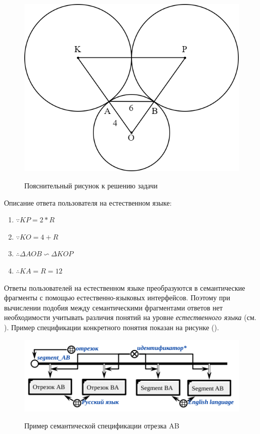\begin{figure}[H]
	\caption{Пояснительный рисунок к решению задачи}
	\includegraphics[scale=0.3]{author/part7/figures/explanatory_illustration_example.png}
	\label{fig:EI_example}
\end{figure}

Описание ответа пользователя на естественном языке:

\begin{enumerate}
	\item $\because KP = 2*R$
	\item $\because KO = 4+R$
	\item $\therefore \Delta A O B\backsim \Delta K O P$
	\item $\therefore K A = R = 12$
\end{enumerate}

Ответы пользователей на естественном языке преобразуются в семантические фрагменты с помощью естественно-языковых интерфейсов. Поэтому при вычислении подобия между семантическими фрагментами ответов нет необходимости учитывать различия понятий на уровне \textit{естественного языка} (см. ). Пример спецификации конкретного понятия показан на рисунке (\textit{}).

\begin{figure}[H]
	\caption{Пример семантической спецификации отрезка AB}
	\includegraphics[scale=0.8]{author/part7/figures/specification_segment_example.png}
	\label{fig:SSE_example}
\end{figure}

